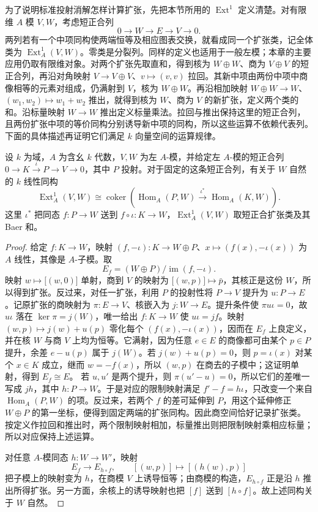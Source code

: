 为了说明标准投射消解怎样计算扩张，先把本节所用的 \(\operatorname{Ext}^1\) 定义清楚。对有限维 \(A\) 模 \(V,W\)，考虑短正合列
\[
	0\longrightarrow W\longrightarrow E\longrightarrow V\longrightarrow0.
\]
两列若有一个中项同构使两端恒等及相应图表交换，就看成同一个扩张类，记全体类为 \(\operatorname{Ext}_A^1(V,W)\)。零类是分裂列。同样的定义也适用于一般左模；本章的主要应用仍取有限维对象。对两个扩张先取直和，得到核为 \(W\oplus W\)、商为 \(V\oplus V\) 的短正合列，再沿对角映射 \(V\to V\oplus V\)、\(v\mapsto(v,v)\) 拉回。其新中项由两份中项中商像相等的元素对组成，仍满射到 \(V\)，核为 \(W\oplus W\)。再沿相加映射 \(W\oplus W\to W\)、\((w_1,w_2)\mapsto w_1+w_2\) 推出，就得到核为 \(W\)、商为 \(V\) 的新扩张，定义两个类的和。沿标量映射 \(W\to W\) 推出定义标量乘法。拉回与推出保持这里的短正合列，且两份扩张中项的等价同构分别诱导新中项的同构，所以这些运算不依赖代表列。下面的具体描述再证明它们满足 \(k\) 向量空间的运算规律。
\begin{proposition}\label{b5:prop:projective-presentation-extensions}
	设 \(k\) 为域，\(A\) 为含幺 \(k\) 代数，\(V,W\) 为左 \(A\)-模，并给定左 \(A\)-模的短正合列 \(0\to K\xrightarrow{\iota}P\to V\to0\)，其中 \(P\) 投射。对于固定的这条短正合列，有关于 \(W\) 自然的 \(k\) 线性同构
	\[
		\operatorname{Ext}_A^1(V,W)\cong \operatorname{coker}\left( \operatorname{Hom}_A(P,W)\xrightarrow{\iota^*} \operatorname{Hom}_A(K,W)\right).
	\]
	这里 \(\iota^*\) 把同态 \(f:P\to W\) 送到 \(f\circ\iota:K\to W\)，\(\operatorname{Ext}_A^1(V,W)\) 取短正合扩张类及其 Baer 和。
\end{proposition}
\begin{proof}
	给定 \(f:K\to W\)，映射 \((f,-\iota):K\to W\oplus P\)、\(x\mapsto(f(x),-\iota(x))\) 为 \(A\) 线性，其像是 \(A\)-子模。取
	\[
		E_f=(W\oplus P)/\operatorname{im}(f,-\iota).
	\]
	映射 \(w\mapsto\bigl[(w,0)\bigr]\) 单射，商到 \(V\) 的映射为 \(\bigl[(w,p)\bigr]\mapsto\bar p\)，其核正是这份 \(W\)，所以得到扩张。反过来，对任一扩张，利用 \(P\) 的投射性将 \(P\to V\) 提升为 \(u:P\to E\)。记原扩张的商映射为 \(\pi:E\to V\)、核嵌入为 \(j:W\to E\)。提升条件使 \(\pi u\iota=0\)，故 \(u\iota\) 落在 \(\ker\pi=j(W)\)，唯一给出 \(f:K\to W\) 使 \(u\iota=jf\)。映射 \((w,p)\mapsto j(w)+u(p)\) 零化每个 \((f(x),-\iota(x))\)，因而在 \(E_f\) 上良定义，并在核 \(W\) 与商 \(V\) 上均为恒等。它满射，因为任意 \(e\in E\) 的商像都可由某个 \(p\in P\) 提升，余差 \(e-u(p)\) 属于 \(j(W)\)。若 \(j(w)+u(p)=0\)，则 \(p=\iota(x)\) 对某个 \(x\in K\) 成立，继而 \(w=-f(x)\)，所以 \((w,p)\) 在商去的子模中；这证明单射，得到 \(E_f\cong E\)。 若 \(u,u'\) 是两个提升，则 \(\pi(u'-u)=0\)，所以它们的差唯一写成 \(jh\)，其中 \(h:P\to W\)。于是对应的限制映射满足 \(f'-f=h\iota\)，只改变一个来自 \(\operatorname{Hom}_A(P,W)\) 的项。反过来，若两个 \(f\) 的差可延伸到 \(P\)，用这个延伸修正 \(W\oplus P\) 的第一坐标，便得到固定两端的扩张同构。因此商空间恰好记录扩张类。按定义作拉回和推出时，两个限制映射相加，标量推出则把限制映射乘相应标量；所以对应保持上述运算。

	对任意 \(A\)-模同态 \(h:W\to W'\)，映射
	\[
		E_f\longrightarrow E_{h\circ f},\qquad [(w,p)]\longmapsto[(h(w),p)]
	\]
	把子模上的映射变为 \(h\)，在商模 \(V\) 上诱导恒等；由商模的构造，\(E_{h\circ f}\) 正是沿 \(h\) 推出所得扩张。另一方面，余核上的诱导映射也把 \([f]\) 送到 \([h\circ f]\)。故上述同构关于 \(W\) 自然。
\end{proof}

